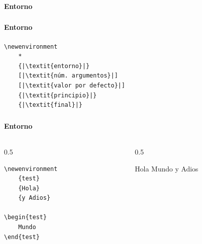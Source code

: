 \documentclass[12pt,aspectratio=169,ignorenonframetext]{ltxbeamer}
\begin{document}
\begin{frame}[fragile]
\frametitle{{\lmr\LaTeXe}}
\framesubtitle{Entorno}

\end{frame}





\begin{frame}[fragile]
\frametitle{{\lmr\LaTeXe}}
\framesubtitle{Entorno}

\begin{verbatim}
\newenvironment
    *
    {|\textit{entorno}|}
    [|\textit{núm. argumentos}|]
    [|\textit{valor por defecto}|]
    {|\textit{principio}|}
    {|\textit{final}|}
\end{verbatim}
\end{frame}





\begin{frame}[fragile]
\frametitle{{\lmr\LaTeXe}}
\framesubtitle{Entorno}

\begin{columns}
    \begin{column}{0.5\textwidth}
        \begin{verbatim}
\newenvironment
    {test}
    {Hola}
    {y Adios}

\begin{test}
    Mundo
\end{test}
        \end{verbatim}
    \end{column}
    {\color{gray} \vline}
    \begin{column}{0.5\linewidth}
        \lmr
        \newenvironment
            {test}
            {Hola}
            {y Adios}

        \begin{test}
            Mundo
        \end{test}
    \end{column}
\end{columns}
\end{frame}
\end{document}

